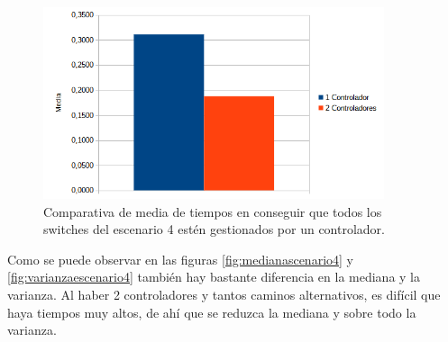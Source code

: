 \documentclass[a4paper, 12pt]{book}
\begin{document}
	\begin{figure}[H]
		\centering
		\includegraphics[width=10cm, keepaspectratio]{img/comparativamediaescenario4}
		\caption{Comparativa de media de tiempos en conseguir que todos los switches del escenario 4 estén gestionados por un controlador.}
		\label{figura:mediaescenario4}
	\end{figure}
	

	Como se puede observar en las figuras \ref{fig:medianascenario4} y \ref{fig:varianzaescenario4} también hay bastante diferencia en la mediana y la varianza. Al haber 2 controladores y tantos caminos alternativos, es difícil que haya tiempos muy altos, de ahí que se reduzca la mediana y sobre todo la varianza.
	
\end{document}
